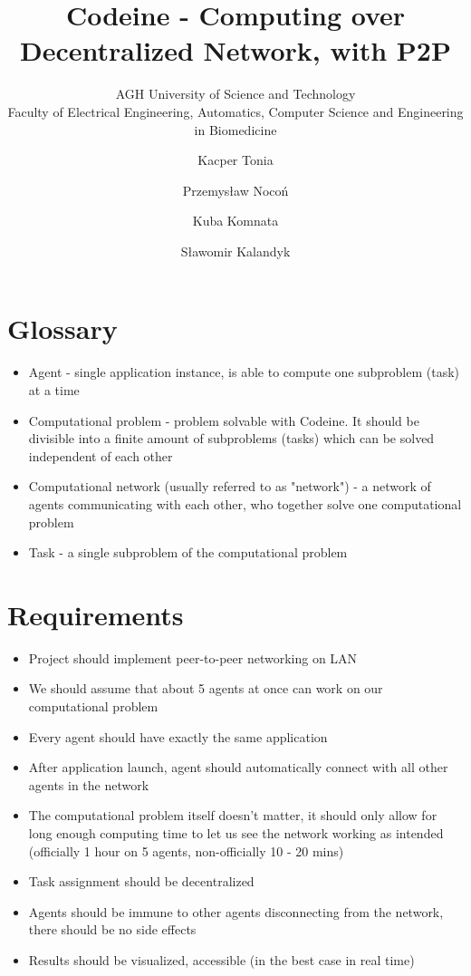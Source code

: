 \documentclass{article}
\title{Codeine - Computing over Decentralized Network, with P2P}
\subtitle{AGH University of Science and Technology\\
    Faculty of Electrical Engineering, Automatics, Computer Science and Engineering in Biomedicine}
\author{Kacper Tonia\and
        Przemysław Nocoń\and
        Kuba Komnata\and
        Sławomir Kalandyk}
\date{}
\begin{document}
\maketitle

\section{Glossary}
\begin{itemize}
    \item Agent - single application instance, is able to compute one subproblem (task) at a time
    \item Computational problem - problem solvable with Codeine. It should be divisible into a finite amount of subproblems (tasks) which can be solved independent of each other
    \item Computational network (usually referred to as "network") - a network of agents communicating with each other, who together solve one computational problem
    \item Task - a single subproblem of the computational problem
\end{itemize}

\section{Requirements}
\begin{itemize}
    \item Project should implement peer-to-peer networking on LAN
    \item We should assume that about 5 agents at once can work on our computational problem
    \item Every agent should have exactly the same application
    \item After application launch, agent should automatically connect with all other agents in the network
    \item The computational problem itself doesn't matter, it should only allow for long enough computing time to let us see the network working as intended (officially 1 hour on 5 agents, non-officially 10 - 20 mins)
    \item Task assignment should be decentralized
    \item Agents should be immune to other agents disconnecting from the network, there should be no side effects
    \item Results should be visualized, accessible (in the best case in real time)
\end{itemize}
\end{document}
